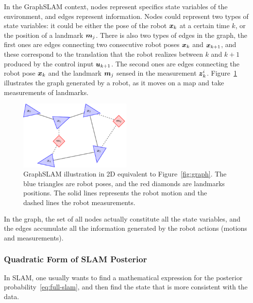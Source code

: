 In the GraphSLAM context, nodes represent specifics state variables of the environment, and edges represent information. Nodes could represent two types of state variables: it could be either the pose of the robot $\boldsymbol{x}_k$ at a certain time $k$, or the position of a landmark $\boldsymbol{m}_j$. There is also two types of edges in the graph, the first ones are edges connecting two consecutive robot poses $\boldsymbol{x}_k$ and $\boldsymbol{x}_{k+1}$, and these correspond to the translation that the robot realizes between $k$ and $k+1$ produced by the control input $\boldsymbol{u}_{k+1}$. The second ones are edges connecting the robot pose $\boldsymbol{x}_k$ and the landmark $\boldsymbol{m}_j$ sensed in the measurement $\boldsymbol{z}_k^i$. Figure~\ref{fig:graphslam} illustrates the graph generated by a robot, as it moves on a map and take measurements of landmarks.

\begin{figure}[htbp!]
    \centering
    \includegraphics[width=0.5\textwidth]{tikz/graphslam.pdf}
    \caption[GraphSLAM ilustration in 2D]{GraphSLAM illustration in 2D equivalent to Figure~\ref{fig:graph}. The blue triangles are robot poses, and the red diamonds are landmarks positions. The solid lines represents the robot motion and the dashed lines the robot measurements.}
    \label{fig:graphslam}
\end{figure} 

In the graph, the set of all nodes actually constitute all the state variables, and the edges accumulate all the information generated by the robot actions (motions and measurements).

\subsubsection{Quadratic Form of SLAM Posterior}

In SLAM, one usually wants to find a mathematical expression for the posterior probability~\eqref{eq:full-slam}, and then find the state that is more consistent with the data.


